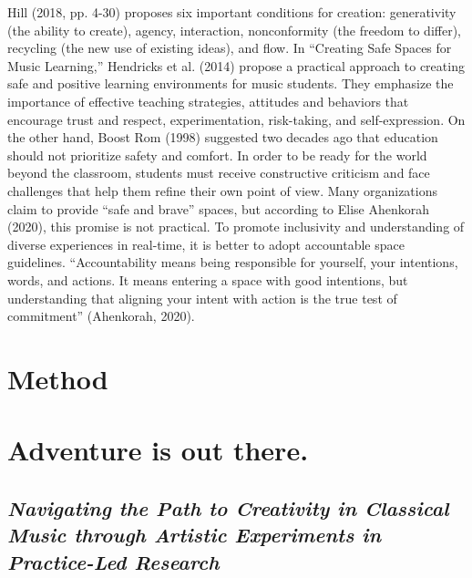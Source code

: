 \documentclass[authordate, empirical, issue]{jote-new-article}
\begin{document}
Hill (2018, pp. 4-30) proposes six important conditions for creation: generativity (the ability to create), agency, interaction, nonconformity (the freedom to differ), recycling (the new use of existing ideas), and flow. In “Creating Safe Spaces for Music Learning,” Hendricks et al. (2014) propose a practical approach to creating safe and positive learning environments for music students. They emphasize the importance of effective teaching strategies, attitudes and behaviors that encourage trust and respect, experimentation, risk-taking, and self-expression. On the other hand, Boost Rom (1998) suggested two decades ago that education should not prioritize safety and comfort. In order to be ready for the world beyond the classroom, students must receive constructive criticism and face challenges that help them refine their own point of view. Many organizations claim to provide “safe and brave” spaces, but according to Elise Ahenkorah (2020), this promise is not practical. To promote inclusivity and understanding of diverse experiences in real-time, it is better to adopt accountable space guidelines. “Accountability means being responsible for yourself, your intentions, words, and actions. It means entering a space with good intentions, but understanding that aligning your intent with action is the true test of commitment” (Ahenkorah, 2020).



\section{Method }



\section{\textbf{Adventure is out there.}}



\subsection{\emph{Navigating the Path to Creativity in Classical Music through Artistic Experiments in Practice-Led Research}}
\end{document}

